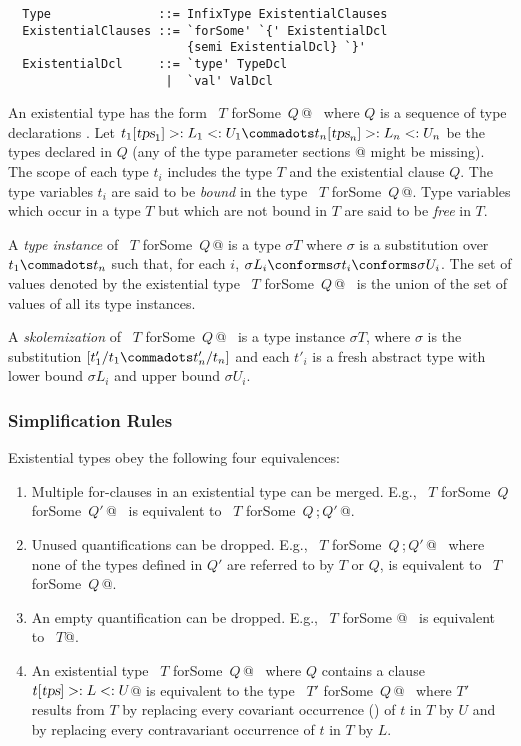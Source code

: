 \syntax\begin{lstlisting}
  Type               ::= InfixType ExistentialClauses
  ExistentialClauses ::= `forSome' `{' ExistentialDcl 
                         {semi ExistentialDcl} `}'
  ExistentialDcl     ::= `type' TypeDcl 
                      |  `val' ValDcl
\end{lstlisting}
An existential type has the form ~\lstinline@$T$ forSome {$\,Q\,$}@~
where $Q$ is a sequence of type declarations .
Let $t_1[\tps_1] >: L_1 <: U_1 \commadots t_n[\tps_n] >: L_n <: U_n$ 
be the types declared in $Q$ (any of the 
type parameter sections \lstinline@[$\tps_i$]@ might be missing).
The scope of each type $t_i$ includes the type $T$ and the existential clause $Q$. 
The type variables $t_i$ are said to be {\em bound} in the type ~\lstinline@$T$ forSome {$\,Q\,$}@.
Type variables which occur in a type $T$ but which are not bound in $T$ are said
to be {\em free} in $T$.

A {\em type instance} of ~\lstinline@$T$ forSome {$\,Q\,$}@ 
is a type $\sigma T$ where $\sigma$ is a substitution over $t_1 \commadots t_n$
such that, for each $i$, $\sigma L_i \conforms \sigma t_i \conforms \sigma U_i$.
The set of values denoted by the existential type ~\lstinline@$T$ forSome {$\,Q\,$}@~
is the union of the set of values of all its type instances.

A {\em skolemization} of ~\lstinline@$T$ forSome {$\,Q\,$}@~ is
a type instance $\sigma T$, where $\sigma$ is the substitution
$[t'_1/t_1 \commadots t'_n/t_n]$ and each $t'_i$ is a fresh abstract type
with lower bound $\sigma L_i$ and upper bound $\sigma U_i$.

\subsubsection*{Simplification Rules}\label{sec:ex-simpl}

Existential types obey the following four equivalences:
\begin{enumerate}
\item
Multiple for-clauses in an existential type can be merged. E.g.,
~\lstinline@$T$ forSome {$\,Q\,$} forSome {$\,Q'\,$}@~
is equivalent to
~\lstinline@$T$ forSome {$\,Q\,$;$\,Q'\,$}@.
\item
Unused quantifications can be dropped. E.g.,
~\lstinline@$T$ forSome {$\,Q\,$;$\,Q'\,$}@~
where none of the types defined in $Q'$ are referred to by $T$ or $Q$,
is equivalent to
~\lstinline@$T$ forSome {$\,Q\,$}@.
\item
An empty quantification can be dropped. E.g.,
~\lstinline@$T$ forSome { }@~ is equivalent to ~\lstinline@$T$@.
\item
An existential type ~\lstinline@$T$ forSome {$\,Q\,$}@~ where $Q$ contains
a clause ~\lstinline@type $t[\mbox{\sl tps}] >: L <: U$@ is equivalent 
to the type ~\lstinline@$T'$ forSome {$\,Q\,$}@~ where $T'$ results from $T$ by replacing every
covariant occurrence () of $t$ in $T$ by $U$ and by replacing every
contravariant occurrence of $t$ in $T$ by $L$.
\end{enumerate}

